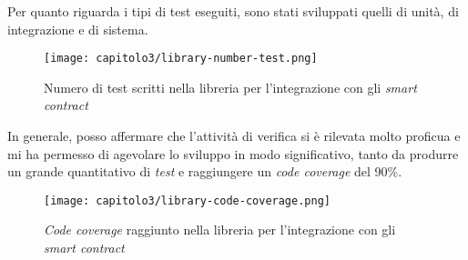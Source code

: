 Per quanto riguarda i tipi di test eseguiti, sono stati sviluppati quelli di unità, di integrazione e di sistema.

\clearpage

\begin{figure}[h!]
  \centering
  \texttt{[image: capitolo3/library-number-test.png]}
  \caption{Numero di test scritti nella libreria per l'integrazione con gli \textit{smart contract}}
\end{figure}

In generale, posso affermare che l'attività di verifica si è rilevata molto proficua e mi ha permesso di agevolare lo sviluppo in modo significativo, tanto da produrre un grande quantitativo di \textit{test} e raggiungere un \textit{code coverage} del 90\%.
 
\clearpage

\begin{figure}[h!]
  \centering
  \texttt{[image: capitolo3/library-code-coverage.png]}
  \caption{\textit{Code coverage} raggiunto nella libreria per l'integrazione con gli \textit{smart contract}}
\end{figure}
